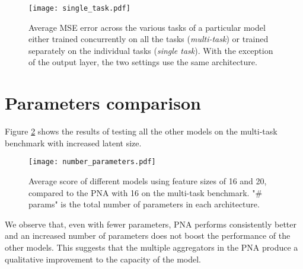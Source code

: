 \documentclass{article}
\begin{document}
\begin{figure}[h]
\centering
\texttt{[image: single\_task.pdf]}
\caption{Average MSE error across the various tasks of a particular model either trained concurrently on all the tasks (\textit{multi-task}) or trained separately on the individual tasks (\textit{single task}). With the exception of the output layer, the two settings use the same architecture.}
\label{fig:single_task}
\end{figure}


\section{Parameters comparison}
\label{app:parameters}

Figure \ref{fig:number_params} shows the results of testing all the other models on the multi-task benchmark with increased latent size.

\begin{figure}[h]
\centering
\texttt{[image: number\_parameters.pdf]}
\caption{Average score of different models using feature sizes of 16 and 20, compared to the PNA with 16 on the multi-task benchmark.  "\# params" is the total number of parameters in each architecture. }
\label{fig:number_params}
\end{figure}


We observe that, even with fewer parameters, PNA performs consistently better and an increased number of parameters does not boost the performance of the other models. This suggests that the multiple aggregators in the PNA produce a qualitative improvement to the capacity of the model.
\end{document}
